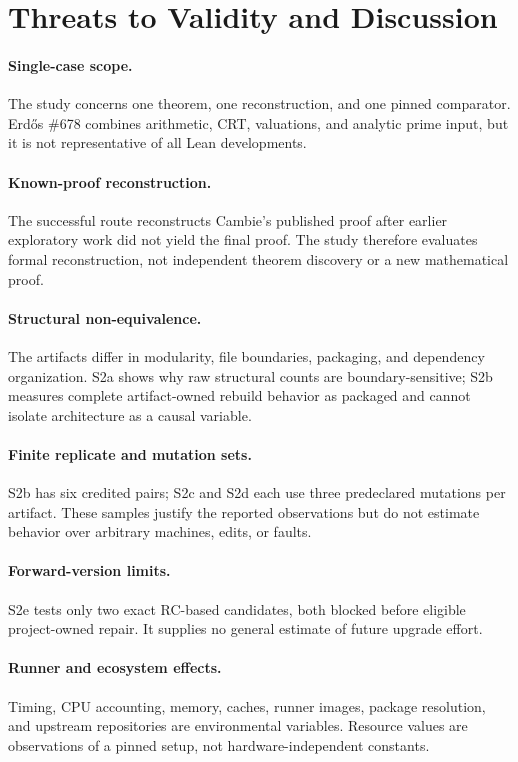 \documentclass[sigplan,10pt,anonymous,review]{acmart}
\begin{document}
\section{Threats to Validity and Discussion}
\paragraph{Single-case scope.}
The study concerns one theorem, one reconstruction, and one pinned comparator. Erd\H{o}s \#678 combines arithmetic, CRT, valuations, and analytic prime input, but it is not representative of all Lean developments.

\paragraph{Known-proof reconstruction.}
The successful route reconstructs Cambie's published proof after earlier exploratory work did not yield the final proof. The study therefore evaluates formal reconstruction, not independent theorem discovery or a new mathematical proof.

\paragraph{Structural non-equivalence.}
The artifacts differ in modularity, file boundaries, packaging, and dependency organization. S2a shows why raw structural counts are boundary-sensitive; S2b measures complete artifact-owned rebuild behavior as packaged and cannot isolate architecture as a causal variable.

\paragraph{Finite replicate and mutation sets.}
S2b has six credited pairs; S2c and S2d each use three predeclared mutations per artifact. These samples justify the reported observations but do not estimate behavior over arbitrary machines, edits, or faults.

\paragraph{Forward-version limits.}
S2e tests only two exact RC-based candidates, both blocked before eligible project-owned repair. It supplies no general estimate of future upgrade effort.

\paragraph{Runner and ecosystem effects.}
Timing, CPU accounting, memory, caches, runner images, package resolution, and upstream repositories are environmental variables. Resource values are observations of a pinned setup, not hardware-independent constants.
\end{document}
